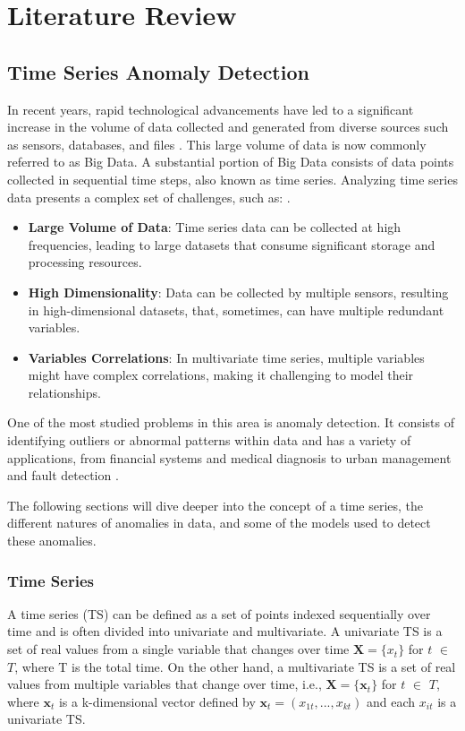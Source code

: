 \chapter{Literature Review}\label{sec2_revisao_lit}
\section{Time Series Anomaly Detection}

In recent years, rapid technological advancements have led to a significant increase in the volume of data collected and generated from diverse sources such as sensors, databases, and files \cite{attoh2017big}. This large volume of data is now commonly referred to as Big Data. A substantial portion of Big Data consists of data points collected in sequential time steps, also known as time series. Analyzing time series data presents a complex set of challenges, such as: \cite{Tsai_Lai_Chao_Vasilakos_2015}. 

\begin{itemize}
    \item \textbf{Large Volume of Data}: Time series data can be collected at high frequencies, leading to large datasets that consume significant storage and processing resources.
    \item \textbf{High Dimensionality}: Data can be collected by multiple sensors, resulting in high-dimensional datasets, that, sometimes, can have multiple redundant variables.
    \item \textbf{Variables Correlations}: In multivariate time series, multiple variables might have complex correlations, making it challenging to model their relationships.
\end{itemize}

One of the most studied problems in this area is anomaly detection. It consists of identifying outliers or abnormal patterns within data and has a variety of applications, from financial systems and medical diagnosis to urban management and fault detection \cite{Samariya_Thakkar_2021}. 

The following sections will dive deeper into the concept of a time series, the different natures of anomalies in data, and some of the models used to detect these anomalies.

\subsection{Time Series}

A time series (TS) can be defined as a set of points indexed sequentially over time and is often divided into univariate and multivariate. A univariate TS is a set of real values from a single variable that changes over time $\textbf{X} = \{x_t\}$ for $t$ $\in$ $T$, where T is the total time. On the other hand, a multivariate TS is a set of real values from multiple variables that change over time, i.e., $\textbf{X} = \{\textbf{x}_t\}$ for $t$ $\in$ $T$, where $\textbf{x}_t$ is a k-dimensional vector defined by $\textbf{x}_t = (x_{1t}, ..., x_{kt})$ and each $x_{it}$ is a univariate TS. 

